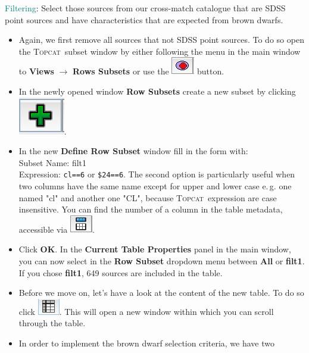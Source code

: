 \documentclass [a4paper, 12pt]{article}
\newcommand{\topcat}{{\textsc{Topcat}}}
\begin{document}
\noindent \textcolor{teal}{Filtering}: Select those sources from our 
cross-match catalogue that are SDSS point sources and have characteristics that 
are expected from brown dwarfs. 
\begin{itemize}
    \item Again, we first remove all sources that not SDSS point sources. To do 
    so open the \topcat\ subset window by either following the menu in the main 
    window to \textbf{Views} $\rightarrow$ \textbf{Rows Subsets} or use the 
    \includegraphics[width=0.04 
    \textwidth]{../images/topcat_button_subset.jpg} button. 
    \item In the newly opened window \textbf{Row Subsets} create a new subset 
    by clicking \includegraphics[width=0.04 
    \textwidth]{../images/topcat_button_add.jpg}. 
    \item In the new \textbf{Define Row Subset} window fill in the form with:\\
    Subset Name: filt1\\
    Expression: \texttt{cl==6} or \texttt{\$24==6}. The second option is 
    particularly useful when two columns have the same name except for upper 
    and lower case e.\,g. one named "cl" and another one "CL", because \topcat\ 
    expression are case insensitive. You can find the number of a column in the 
    table metadata, accessible via \includegraphics[width=0.04 
    \textwidth]{../images/topcat_button_metadata.jpg}. 
    \item Click \textbf{OK}. In the \textbf{Current Table Properties} panel in 
    the main window, you can now select in the \textbf{Row Subset} dropdown 
    menu between \textbf{All} or \textbf{filt1}. If you chose \textbf{filt1}, 
    649 sources are included in the table. 
    \item Before we move on, let's have a look at the content of the new table. 
    To do so click \includegraphics[width=0.04 
    \textwidth]{../images/topcat_button_open-tab.jpg}. This will open a new 
    window within 
    which you can scroll through the table. 
    \item In order to implement the brown dwarf selection criteria, we have two 

\end{itemize}
\end{document}
